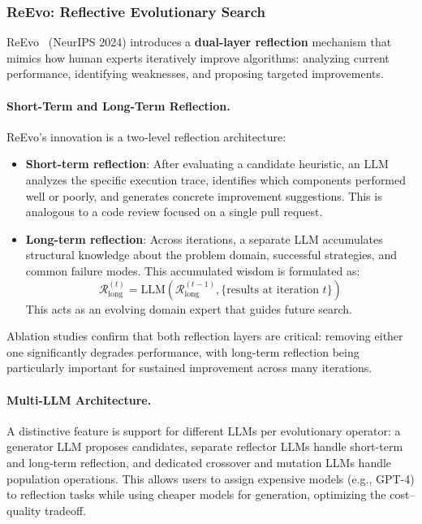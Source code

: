 \subsubsection{ReEvo: Reflective Evolutionary Search}

ReEvo~\citep{ye2024reevo} (NeurIPS 2024) introduces a \textbf{dual-layer reflection} mechanism that mimics how human experts iteratively improve algorithms: analyzing current performance, identifying weaknesses, and proposing targeted improvements.

\paragraph{Short-Term and Long-Term Reflection.}
ReEvo's innovation is a two-level reflection architecture:
\begin{itemize}
    \item \textbf{Short-term reflection}: After evaluating a candidate heuristic, an LLM analyzes the specific execution trace, identifies which components performed well or poorly, and generates concrete improvement suggestions. This is analogous to a code review focused on a single pull request.
    \item \textbf{Long-term reflection}: Across iterations, a separate LLM accumulates structural knowledge about the problem domain, successful strategies, and common failure modes. This accumulated wisdom is formulated as:
\begin{equation}
\mathcal{R}_{\text{long}}^{(t)} = \text{LLM}\left(\mathcal{R}_{\text{long}}^{(t-1)}, \{\text{results at iteration } t\}\right)
\end{equation}
This acts as an evolving domain expert that guides future search.
\end{itemize}
Ablation studies confirm that both reflection layers are critical: removing either one significantly degrades performance, with long-term reflection being particularly important for sustained improvement across many iterations.

\paragraph{Multi-LLM Architecture.}
A distinctive feature is support for different LLMs per evolutionary operator: a generator LLM proposes candidates, separate reflector LLMs handle short-term and long-term reflection, and dedicated crossover and mutation LLMs handle population operations. This allows users to assign expensive models (e.g., GPT-4) to reflection tasks while using cheaper models for generation, optimizing the cost--quality tradeoff.

